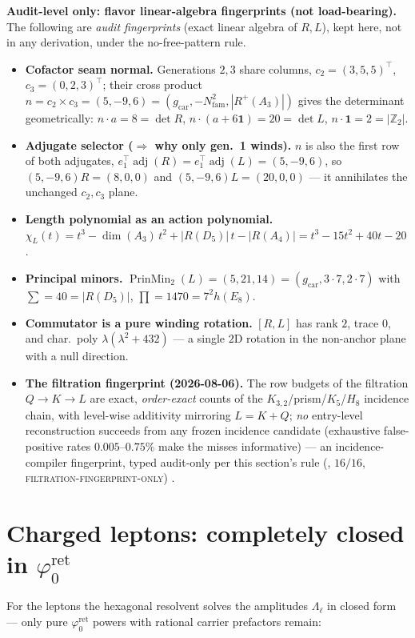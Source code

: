 \documentclass[11pt,a4paper]{article}
\newcommand{\gcar}{g_{\mathrm{car}}}
\newcommand{\Nfam}{N_{\mathrm{fam}}}
\newcommand{\phiz}{\varphi_0^{\mathrm{ret}}}
\newcommand{\Z}{\mathbb{Z}}
\theoremstyle{definition}
\begin{document}
\par\smallskip\noindent\textbf{Audit-level only: flavor linear-algebra fingerprints (not load-bearing).}
The following are \emph{audit fingerprints} (exact linear algebra of $R,L$), kept here, not in any
derivation, under the no-free-pattern rule. \mE
\begin{itemize}\setlength\itemsep{2pt}
\item\textbf{Cofactor seam normal.} Generations $2,3$ share columns, $c_2{=}(3,5,5)^{\!\top}$,
$c_3{=}(0,2,3)^{\!\top}$; their cross product $n=c_2\times c_3=(5,-9,6)=(\gcar,-\Nfam^2,|R^+(A_3)|)$
gives the determinant geometrically: $n\cdot a=8=\det R$, $n\cdot(a{+}6\mathbf1)=20=\det L$, $n\cdot\mathbf1=2=|\Z_2|$.
\item\textbf{Adjugate selector ($\Rightarrow$ why only gen.\ 1 winds).} $n$ is also the first row of both
adjugates, $e_1^{\!\top}\!\operatorname{adj}(R)=e_1^{\!\top}\!\operatorname{adj}(L)=(5,-9,6)$, so
$(5,-9,6)R=(8,0,0)$ and $(5,-9,6)L=(20,0,0)$ --- it annihilates the unchanged $c_2,c_3$ plane.
\item\textbf{Length polynomial as an action polynomial.}
$\chi_L(t)=t^3-\dim(A_3)\,t^2+|R(D_5)|\,t-|R(A_4)|=t^3-15t^2+40t-20$.
\item\textbf{Principal minors.} $\operatorname{PrinMin}_2(L)=(5,21,14)=(\gcar,3{\cdot}7,2{\cdot}7)$ with
$\sum=40=|R(D_5)|$, $\prod=1470=7^2 h(E_8)$.
\item\textbf{Commutator is a pure winding rotation.} $[R,L]$ has rank $2$, trace $0$, and char.\ poly
$\lambda(\lambda^2+432)$ --- a single $2$D rotation in the non-anchor plane with a null direction.
\item\textbf{The filtration fingerprint (2026-08-06).} The row budgets of the filtration
$Q\to K\to L$ are exact, \emph{order-exact} counts of the $K_{3,2}$/prism/$K_5$/$H_8$ incidence
chain, with level-wise additivity mirroring $L=K+Q$; \emph{no} entry-level reconstruction succeeds
from any frozen incidence candidate (exhaustive false-positive rates $0.005$--$0.75\%$ make the
misses informative) --- an incidence-compiler fingerprint, typed audit-only per this section's rule
(, $16/16$, \textsc{filtration-fingerprint-only}) \mE.
\end{itemize}
\par\smallskip

\section{Charged leptons: completely closed in $\phiz$}
For the leptons the hexagonal resolvent solves the amplitudes $\Lambda_\ell$ in closed form --- only pure
$\phiz$ powers with rational carrier prefactors remain:
\end{document}
